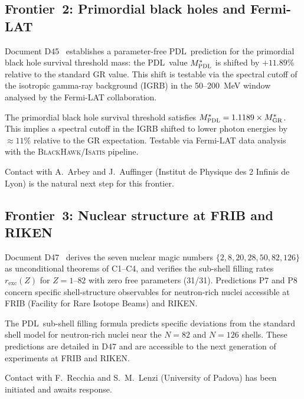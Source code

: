 \documentclass[12pt,a4paper]{article}
\newenvironment{predbox}[1][]{%
  \begin{tcolorbox}[predstyle,title={Falsifiable Prediction\ifx\relax#1\relax\else: #1\fi}]}{\end{tcolorbox}}
\theoremstyle{definition}
\newcommand{\PDL}{\textsc{PDL}}
\begin{document}
\subsection{Frontier~2: Primordial black holes and Fermi-LAT}

Document D45~\cite{PDL_D45} establishes a parameter-free \PDL\ prediction for the primordial black hole survival threshold mass: the \PDL\ value $M^*_{\PDL}$ is shifted by $+11.89\%$ relative to the standard GR value. This shift is testable via the spectral cutoff of the isotropic gamma-ray background (IGRB) in the 50--200~MeV window analysed by the Fermi-LAT collaboration.

\begin{predbox}[P-PBH (D45)]
The primordial black hole survival threshold satisfies $M^*_{\PDL} = 1.1189 \times M^*_{\mathrm{GR}}$. This implies a spectral cutoff in the IGRB shifted to lower photon energies by $\approx 11\%$ relative to the GR expectation. Testable via Fermi-LAT data analysis with the \textsc{BlackHawk}/\textsc{Isatis} pipeline.
\end{predbox}

Contact with A.\ Arbey and J.\ Auffinger (Institut de Physique des 2 Infinis de Lyon) is the natural next step for this frontier.

\subsection{Frontier~3: Nuclear structure at FRIB and RIKEN}

Document D47~\cite{PDL_D47} derives the seven nuclear magic numbers $\{2, 8, 20, 28, 50, 82, 126\}$ as unconditional theorems of C1--C4, and verifies the sub-shell filling rates $r_{\mathrm{exc}}(Z)$ for $Z = 1$--$82$ with zero free parameters (31/31). Predictions P7 and P8 concern specific shell-structure observables for neutron-rich nuclei accessible at FRIB (Facility for Rare Isotope Beams) and RIKEN.

\begin{predbox}[P7/P8 (D47)]
The \PDL\ sub-shell filling formula predicts specific deviations from the standard shell model for neutron-rich nuclei near the $N=82$ and $N=126$ shells. These predictions are detailed in D47 and are accessible to the next generation of experiments at FRIB and RIKEN.
\end{predbox}

Contact with F.\ Recchia and S.\ M.\ Lenzi (University of Padova) has been initiated and awaits response.
\end{document}
